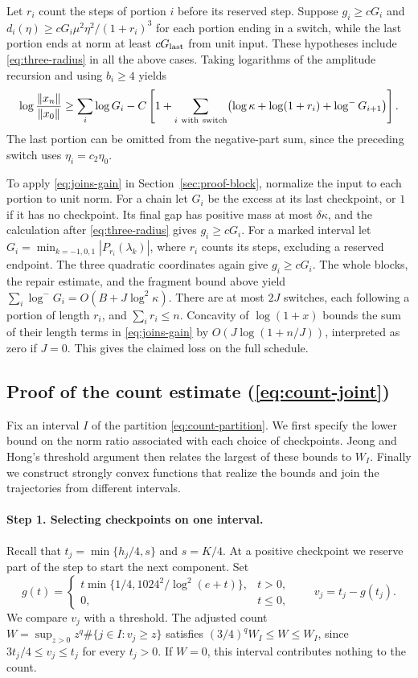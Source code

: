\documentclass[11pt]{article}
\theoremstyle{definition}
\begin{document}
Let \(r_i\) count the steps of portion \(i\) before its reserved step.
Suppose \(g_i\ge cG_i\) and
\(d_i(\eta)\ge cG_i\mu^2\eta^2/(1+r_i)^3\) for each portion
ending in a switch, while the last portion ends at norm at least
\(cG_{\rm last}\) from unit input. These hypotheses include
\eqref{eq:three-radius} in all the above cases. Taking logarithms
of the amplitude recursion and using \(b_i\ge4\) yields
\begin{equation}\label{eq:joins-gain}
 \log\frac{\|x_n\|}{\|x_0\|}\ge
 \sum_i\log G_i-
 C\left[1+\sum_{i\ {\rm with\ switch}}\!
       \left(\log\kappa+\log(1+r_i)+\log^- G_{i+1}\right)\right].
\end{equation}
The last portion can be omitted from the negative-part sum, since the preceding switch uses \(\eta_i=c_2\eta_0\).

To apply \eqref{eq:joins-gain} in Section~\ref{sec:proof-block}, normalize the
input to each portion to unit norm. For a chain let \(G_i\) be the excess
at its last checkpoint, or \(1\) if it has no checkpoint. Its final gap
has positive mass at most \(\delta\kappa\), and the calculation after
\eqref{eq:three-radius} gives \(g_i\ge cG_i\). For a marked interval
let \(G_i=\min_{k=-1,0,1}|P_{r_i}(\lambda_k)|\), where \(r_i\) counts
its steps, excluding a reserved endpoint. The three quadratic coordinates
again give \(g_i\ge cG_i\). The whole blocks, the repair estimate,
and the fragment bound above yield
\(\sum_i\log^-G_i=O(B+J\log^2\kappa)\).
There are at most \(2J\) switches, each following a portion of length
\(r_i\), and \(\sum_i r_i\le n\). Concavity of \(\log(1+x)\) bounds
the sum of their length terms in \eqref{eq:joins-gain} by
\(O(J\log(1+n/J))\), interpreted as zero if \(J=0\). This gives the
claimed loss on the full schedule.
\subsection{Proof of the count estimate (\ref{eq:count-joint})}\label{app:tests}

Fix an interval \(I\) of the partition \eqref{eq:count-partition}.
We first specify the lower bound on the norm ratio associated with
each choice of checkpoints. Jeong and Hong's threshold argument
then relates the largest of these bounds to \(W_I\). Finally we
construct strongly convex functions that realize the bounds and join
the trajectories from different intervals.

\paragraph{Step 1. Selecting checkpoints on one interval.}
Recall that \(t_j=\min\{h_j/4,s\}\) and \(s=K/4\). At a positive
checkpoint we reserve part of the step to start the next component. Set
\[
 g(t)=
 \begin{cases}
 t\min\{1/4,1024^2/\log^2(e+t)\},& t>0,\\
 0,&t\le0,
 \end{cases}
 \qquad v_j=t_j-g(t_j).
\]
We compare \(v_j\) with a threshold. The adjusted count
\(W=\sup_{z>0}z^q\#\{j\in I:v_j\ge z\}\) satisfies
\((3/4)^q W_I\le W\le W_I\), since \(3t_j/4\le v_j\le t_j\)
for every \(t_j>0\). If \(W=0\), this interval contributes nothing
to the count.
\end{document}
